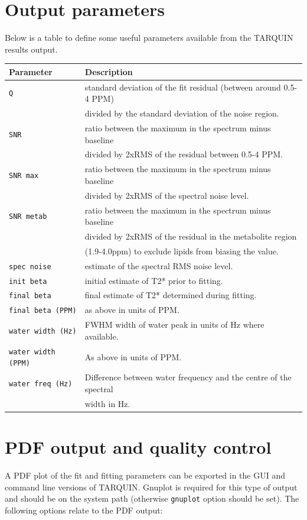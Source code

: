 \documentclass[a4paper,12pt]{article}
\begin{document}
\section{Output parameters}
Below is a table to define some useful parameters available from the TARQUIN results output.
\vspace{\baselineskip}

\begin{tabular}{l l}
Parameter & Description \\
\hline
\texttt{Q} & standard deviation of the fit residual (between around 0.5-4 PPM) \\& divided by the standard deviation of the noise region. \\
\texttt{SNR} & ratio between the maximum in the spectrum minus baseline \\& divided by 2xRMS of the residual between 0.5-4 PPM. \\
\texttt{SNR max} & ratio between the maximum in the spectrum minus baseline \\& divided by 2xRMS of the spectral noise level. \\
\texttt{SNR metab} & ratio between the maximum in the spectrum minus baseline \\& divided by 2xRMS of the residual in the metabolite region \\& (1.9-4.0ppm) to exclude lipids from biasing the value. \\
\texttt{spec noise} & estimate of the spectral RMS noise level. \\
\texttt{init beta} & initial estimate of T2* prior to fitting. \\
\texttt{final beta} & final estimate of T2* determined during fitting. \\
\texttt{final beta (PPM)} & as above in units of PPM.\\
\texttt{water width (Hz)} & FWHM width of water peak in units of Hz where available. \\
\texttt{water width (PPM)} & As above in units of PPM. \\
\texttt{water freq (Hz)} & Difference between water frequency and the centre of the spectral \\& width in Hz. \\
\end{tabular}

\section{PDF output and quality control}
A PDF plot of the fit and fitting parameters can be exported in the GUI and command line versions of TARQUIN. Gnuplot is required for this type of output and should be on the system path (otherwise \texttt{gnuplot} option should be set). The following options relate to the PDF output:
\end{document}
